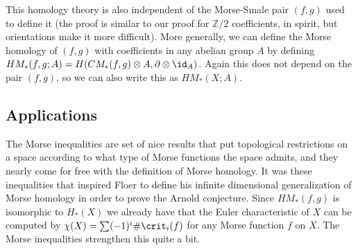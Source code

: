 {This homology theory is also independent of the Morse-Smale pair $(f,g)$ used to define it (the proof is similar to our proof for $\mathbb Z/2$ coefficients, in spirit, but orientations make it more difficult). More generally, we can define the Morse homology of $(f,g)$ with coefficients in any abelian group $A$ by defining $HM_*(f,g;A) = H(CM_*(f,g) \otimes A,\partial \otimes \id_A)$. Again this does not depend on the pair $(f,g)$, so we can also write this as $HM_*(X;A)$.
}









\subsection{Applications}
\label{Morse Homology Applications}

The Morse inequalities are set of nice results that put topological restrictions on a space according to what type of Morse functions the space admits, and they nearly come for free with the definition of Morse homology. It was these inequalities that inspired Floer to define his infinite dimensional generalization of Morse homology in order to prove the Arnold conjecture. Since $HM_*(f,g)$ is isomorphic to $H_*(X)$ we already have that the Euler characteristic of $X$ can be computed by $\chi(X) = \sum (-1)^i \# \crit_i(f)$ for any Morse function $f$ on $X$. The Morse inequalities strengthen this quite a bit.

